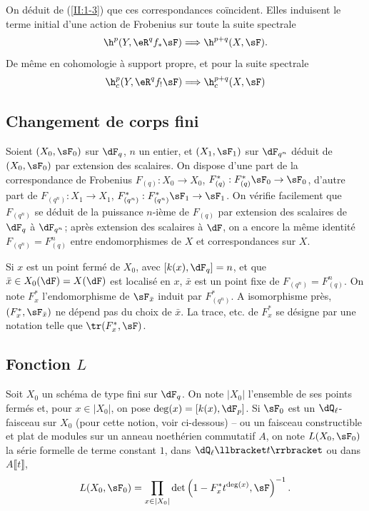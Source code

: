 On déduit de (\ref{II:1-3}) que ces correspondances coïncident. Elles 
induisent le terme initial d'une action de Frobenius sur toute la suite 
spectrale 
\[
  \h^p(Y,\eR^q f_*\sF) \Longrightarrow \h^{p+q}(X,\sF) \text{.}
\]
De même en cohomologie à support propre, et pour la suite spectrale 
\[
  \h_c^p(Y,\eR^q f_! \sF) \Longrightarrow \h_c^{p+q}(X,\sF)
\]





\subsection{Changement de corps fini}\label{II:1-5}

Soient $(X_0,\sF_0)$ sur $\dF_q$, $n$ un entier, et $(X_1,\sF_1)$ sur 
$\dF_{q^n}$ déduit de $(X_0,\sF_0)$ par extension des scalaires. On dispose 
d'une part de la correspondance de Frobenius $F_{(q)}:X_0\to X_0$, 
$F_{(q)}^*:F_{(q)}^*\sF_0\to \sF_0$, d'autre part de 
$F_{(q^n)}:X_1\to X_1$, $F_{(q^n)}^*:F_{(q^n)}^*\sF_1\to\sF_1$. On vérifie 
facilement que $F_{(q^n)}$ se déduit de la puissance $n$-ième de $F_{(q)}$ 
par extension des scalaires de $\dF_q$ à $\dF_{q^n}$; après extension des 
scalaires à $\dF$, on a encore la même identité $F_{(q^n)}=F_{(q)}^n$ 
entre endomorphismes de $X$ et correspondances sur $X$. 

Si $x$ est un point fermé de $X_0$, avec $[k(x),\dF_q]=n$, et que 
$\bar x\in X_0(\dF) = X(\dF)$ est localisé en $x$, $\bar x$ est un point 
fixe de $F_{(q^n)}=F_{(q)}^n$. On note $F_x^*$ l'endomorphisme de 
$\sF_{\bar x}$ induit par $F_{(q^n)}^*$. A isomorphisme près, 
$(F_x^*,\sF_{\bar x})$ ne dépend pas du choix de $\bar x$. La trace, 
etc. de $F_x^*$ se désigne par une notation telle que 
$\tr(F_x^*,\sF)$. 





\subsection{Fonction \texorpdfstring{$L$}{L}}\label{II:1-6}

Soit $X_0$ un schéma de type fini sur $\dF_q$. On note $|X_0|$ l'ensemble de 
ses points fermés et, pour $x\in |X_0|$, on pose $\deg(x)=[k(x),\dF_p]$. Si 
$\sF_0$ est un $\dQ_\ell$-faisceau sur $X_0$ (pour cette notion, voir 
ci-dessous) -- ou un faisceau constructible et plat de modules sur un 
anneau noethérien commutatif $A$, on note $L(X_0,\sF_0)$ la série formelle 
de terme constant $1$, dans $\dQ_\ell\llbracket t\rrbracket$ ou dans 
$A\llbracket t\rrbracket$, 
\[
  L(X_0,\sF_0) = \prod_{x\in|X_0|} \det\left(1-F_x^* t^{\deg(x)},\sF\right)^{-1} \text{.}
\]





